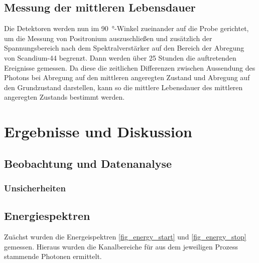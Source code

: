\documentclass[
	a4paper,
	12pt,
	pagesize,
	ngerman
]{scrartcl}
\begin{document}
	\subsection{Messung der mittleren Lebensdauer}

	Die Detektoren werden nun im \SI{90}{\degree}-Winkel zueinander auf die Probe gerichtet, um die Messung von Positronium auszuschließen und zusätzlich der Spannungsbereich nach dem Spektralverstärker auf den Bereich der Abregung von Scandium-44 begrenzt.
	Dann werden über \num{25} Stunden die auftretenden Ereignisse gemessen.
	Da diese die zeitlichen Differenzen zwischen Aussendung des Photons bei Abregung auf den mittleren angeregten Zustand und Abregung auf den Grundzustand darstellen, kann so die mittlere Lebensdauer des mittleren angeregten Zustands bestimmt werden.


	\section{Ergebnisse und Diskussion}


	\subsection{Beobachtung und Datenanalyse}
	\subsubsection{Unsicherheiten}

	\subsection{Energiespektren}
	Zuächst wurden die Energeispektren \cref{fig_energy_start} und \cref{fig_energy_stop} gemessen. Hieraus wurden die Kanalbereiche für aus dem jeweiligen Prozess stammende Photonen ermittelt.

\end{document}

